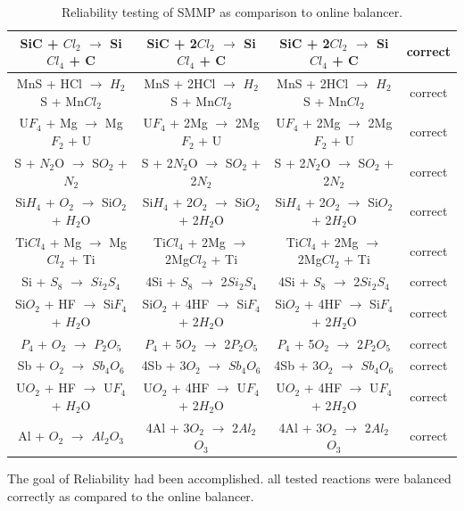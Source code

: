 \documentclass[12pt, titlepage]{article}
\begin{document}
\begin{table}[h!]
{\begin{tabular}{|c|c|c|c|}
SiC + $Cl_2$ $\rightarrow$ Si$Cl_4$ + C & SiC + 2$Cl_2$ $\rightarrow$ Si$Cl_4$ + C & SiC + 2$Cl_2$ $\rightarrow$ Si$Cl_4$ + C & correct \\ \hline
MnS + HCl $\rightarrow$ $H_2$S + Mn$Cl_2$ & MnS + 2HCl $\rightarrow$ $H_2$S + Mn$Cl_2$ & MnS + 2HCl $\rightarrow$ $H_2$S + Mn$Cl_2$ & correct  \\ \hline
 U$F_4$ + Mg $\rightarrow$ Mg$F_2$ + U & U$F_4$ + 2Mg $\rightarrow$ 2Mg$F_2$ + U &  U$F_4$ + 2Mg $\rightarrow$ 2Mg$F_2$ + U & correct  \\ \hline
S + $N_2$O $\rightarrow$ S$O_2$ + $N_2$ & S + 2$N_2$O $\rightarrow$ S$O_2$ + 2$N_2$ & S + 2$N_2$O $\rightarrow$ S$O_2$ + 2$N_2$ & correct  \\ \hline
Si$H_4$ + $O_2$ $\rightarrow$ Si$O_2$ + $H_2$O & Si$H_4$ + 2$O_2$ $\rightarrow$ Si$O_2$ + 2$H_2$O & Si$H_4$ + 2$O_2$ $\rightarrow$ Si$O_2$ + 2$H_2$O & correct  \\ \hline
Ti$Cl_4$ + Mg $\rightarrow$ Mg$Cl_2$ + Ti & Ti$Cl_4$ + 2Mg $\rightarrow$ 2Mg$Cl_2$ + Ti  & Ti$Cl_4$ + 2Mg $\rightarrow$ 2Mg$Cl_2$ + Ti & correct  \\ \hline
Si + $S_8$ $\rightarrow$ $Si_2$$S_4$ & 4Si + $S_8$ $\rightarrow$ 2$Si_2$$S_4$ & 4Si + $S_8$ $\rightarrow$ 2$Si_2$$S_4$ & correct \\ \hline
Si$O_2$ + HF $\rightarrow$ Si$F_4$ + $H_2$O & Si$O_2$ + 4HF $\rightarrow$ Si$F_4$ + 2$H_2$O & Si$O_2$ + 4HF $\rightarrow$ Si$F_4$ + 2$H_2$O & correct \\ \hline
$P_4$ + $O_2$ $\rightarrow$ $P_2$$O_5$ & $P_4$ + 5$O_2$ $\rightarrow$ 2$P_2$$O_5$ & $P_4$ + 5$O_2$ $\rightarrow$ 2$P_2$$O_5$& correct \\ \hline
Sb + $O_2$ $\rightarrow$ $Sb_4$$O_6$ & 4Sb + 3$O_2$ $\rightarrow$ $Sb_4$$O_6$ & 4Sb + 3$O_2$ $\rightarrow$ $Sb_4$$O_6$ & correct \\ \hline
U$O_2$ + HF $\rightarrow$ U$F_4$ + $H_2$O  & U$O_2$ + 4HF $\rightarrow$ U$F_4$ + 2$H_2$O  & U$O_2$ + 4HF $\rightarrow$ U$F_4$ + 2$H_2$O & correct \\ \hline
Al + $O_2$ $\rightarrow$ $Al_2$$O_3$ & 4Al + 3$O_2$ $\rightarrow$ 2$Al_2$$O_3$ & 4Al + 3$O_2$ $\rightarrow$ 2$Al_2$$O_3$ & correct  \\ \hline
\hline
\end{tabular}}
\caption{Reliability testing of SMMP as comparison to online balancer.}
\label{Table:R_trace}
\end{table}

The goal of Reliability had been accomplished. all tested reactions were balanced correctly as compared to the online balancer. 
	
\end{document}
